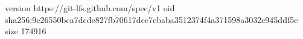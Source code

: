 version https://git-lfs.github.com/spec/v1
oid sha256:9c26550bca7dcde827fb70617dee7cbaba3512374f4a371598a3032c945ddf5e
size 174916
